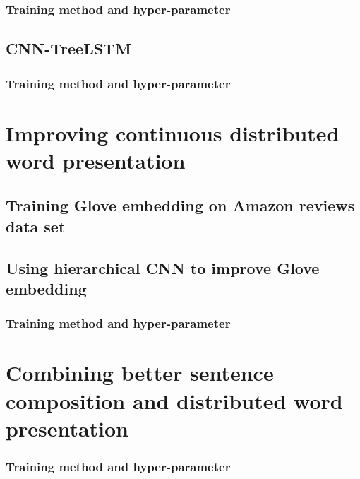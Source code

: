 \subsubsection{Training method and hyper-parameter}


\subsection{CNN-TreeLSTM}

\subsubsection{Training method and hyper-parameter}


\section{Improving continuous distributed word presentation}

\subsection{Training Glove embedding on Amazon reviews data set}

\subsection{Using hierarchical CNN to improve Glove embedding}

\subsubsection{Training method and hyper-parameter}


\section{Combining better sentence composition and distributed word presentation}

\subsubsection{Training method and hyper-parameter}
